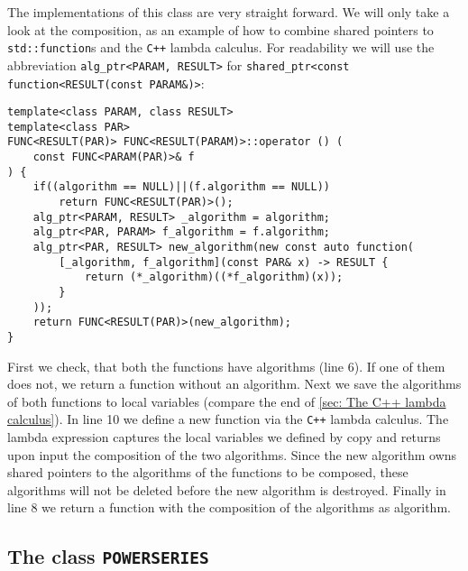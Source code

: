\documentclass{article}
\newcommand{\cc}{\texttt{C++}\xspace}
\newcommand{\code}[1]{\texttt{#1}}
\newcommand{\func}[1]{\texttt{#1}}
\begin{document}
The implementations of this class are very straight forward. We will only take a look at the composition, as an example of how to combine shared pointers to \code{std::function}s and the \cc lambda calculus. For readability we will use the abbreviation \code{alg\_ptr<PARAM, RESULT>} for \code{shared\_ptr<const function<RESULT(const PARAM\&)>}:
\begin{lstlisting}
template<class PARAM, class RESULT>
template<class PAR>
FUNC<RESULT(PAR)> FUNC<RESULT(PARAM)>::operator () (
	const FUNC<PARAM(PAR)>& f
) {
	if((algorithm == NULL)||(f.algorithm == NULL))
		return FUNC<RESULT(PAR)>();
	alg_ptr<PARAM, RESULT> _algorithm = algorithm;
	alg_ptr<PAR, PARAM> f_algorithm = f.algorithm;
	alg_ptr<PAR, RESULT> new_algorithm(new const auto function(
		[_algorithm, f_algorithm](const PAR& x) -> RESULT {
			return (*_algorithm)((*f_algorithm)(x));
		}
	));
	return FUNC<RESULT(PAR)>(new_algorithm);
}
\end{lstlisting}
First we check, that both the functions have algorithms (line 6). If one of them does not, we return a function without an algorithm. Next we save the algorithms of both functions to local variables (compare the end of \cref{sec: The C++ lambda calculus}). In line 10 we define a new function via the \cc lambda calculus. The lambda expression captures the local variables we defined by copy and returns upon input the composition of the two algorithms. Since the new algorithm owns shared pointers to the algorithms of the functions to be composed, these algorithms will not be deleted before the new algorithm is destroyed. Finally in line 8 we return a function with the composition of the algorithms as algorithm.


\subsection{The class \func{POWERSERIES}}
\end{document}
